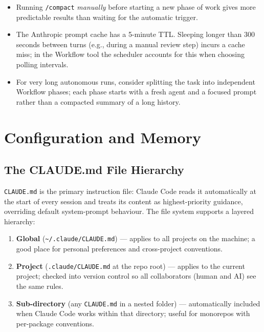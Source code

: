 \begin{itemize}
  \item Running \texttt{/compact} \emph{manually} before starting a new phase
        of work gives more predictable results than waiting for the automatic
        trigger.
  \item The Anthropic prompt cache has a 5-minute TTL.  Sleeping longer than
        300 seconds between turns (e.g., during a manual review step) incurs a
        cache miss; in the Workflow tool the scheduler accounts for this when
        choosing polling intervals.
  \item For very long autonomous runs, consider splitting the task into
        independent Workflow phases; each phase starts with a fresh agent and a
        focused prompt rather than a compacted summary of a long history.
\end{itemize}

\section{Configuration and Memory}
\label{app:claude-code:config}

\subsection{The CLAUDE.md File Hierarchy}
\label{app:claude-code:claude-md}

\texttt{CLAUDE.md} is the primary instruction file: Claude Code reads it
automatically at the start of every session and treats its content as
highest-priority guidance, overriding default system-prompt behaviour.  The
file system supports a layered hierarchy:

\begin{enumerate}
  \item \textbf{Global} (\texttt{\textasciitilde/.claude/CLAUDE.md}) ---
        applies to all projects on the machine; a good place for personal
        preferences and cross-project conventions.
  \item \textbf{Project} (\texttt{.claude/CLAUDE.md} at the repo root) ---
        applies to the current project; checked into version control so all
        collaborators (human and AI) see the same rules.
  \item \textbf{Sub-directory} (any \texttt{CLAUDE.md} in a nested folder) ---
        automatically included when Claude Code works within that directory;
        useful for monorepos with per-package conventions.
\end{enumerate}

